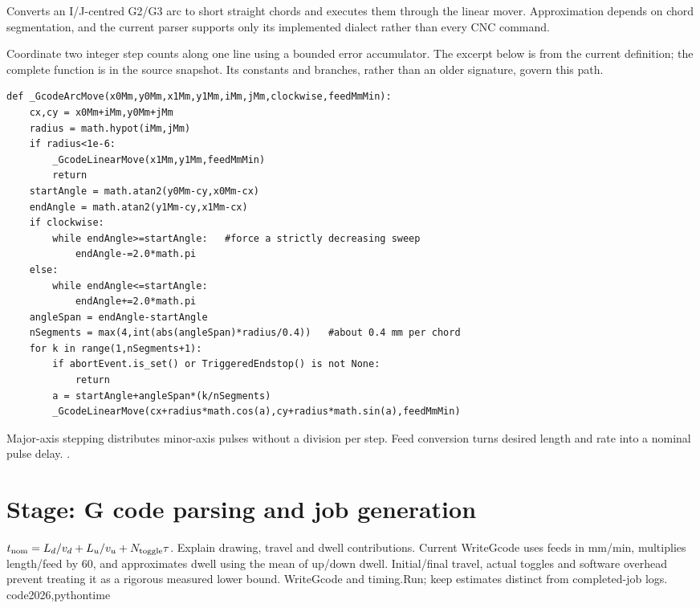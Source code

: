 Converts an I/J-centred G2/G3 arc to short straight chords and executes them through the linear mover. Approximation depends on chord segmentation, and the current parser supports only its implemented dialect rather than every CNC command.


Coordinate two integer step counts along one line using a bounded error accumulator. The excerpt below is from the current definition; the complete function is in the source snapshot. Its constants and branches, rather than an older signature, govern this path.


\begin{lstlisting}[style=plain]
def _GcodeArcMove(x0Mm,y0Mm,x1Mm,y1Mm,iMm,jMm,clockwise,feedMmMin):
    cx,cy = x0Mm+iMm,y0Mm+jMm
    radius = math.hypot(iMm,jMm)
    if radius<1e-6:
        _GcodeLinearMove(x1Mm,y1Mm,feedMmMin)
        return
    startAngle = math.atan2(y0Mm-cy,x0Mm-cx)
    endAngle = math.atan2(y1Mm-cy,x1Mm-cx)
    if clockwise:
        while endAngle>=startAngle:   #force a strictly decreasing sweep
            endAngle-=2.0*math.pi
    else:
        while endAngle<=startAngle:
            endAngle+=2.0*math.pi
    angleSpan = endAngle-startAngle
    nSegments = max(4,int(abs(angleSpan)*radius/0.4))   #about 0.4 mm per chord
    for k in range(1,nSegments+1):
        if abortEvent.is_set() or TriggeredEndstop() is not None:
            return
        a = startAngle+angleSpan*(k/nSegments)
        _GcodeLinearMove(cx+radius*math.cos(a),cy+radius*math.sin(a),feedMmMin)
\end{lstlisting}
Major-axis stepping distributes minor-axis pulses without a division per step. Feed conversion turns desired length and rate into a nominal pulse delay. \cite{bresenham1965,a4988datasheet,kernelgpio}.


\section*{Stage: G code parsing and job generation}
{$t_{\rm nom}=L_d/v_d+L_u/v_u+N_{\rm toggle}\tau$.}
{Explain drawing, travel and dwell contributions. Current WriteGcode uses
feeds in mm/min, multiplies length/feed by 60, and approximates dwell using
the mean of up/down dwell. Initial/final travel, actual toggles and software
overhead prevent treating it as a rigorous measured lower bound.}
{WriteGcode and timing.Run; keep estimates distinct from completed-job logs.}
{code2026,pythontime}


